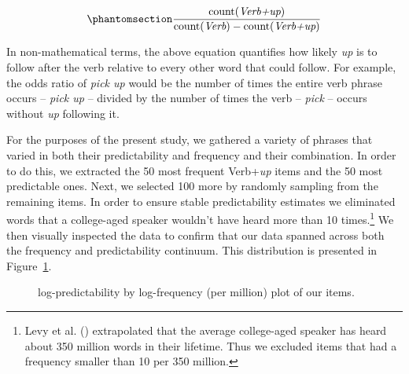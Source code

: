 \documentclass[
  12pt,
  letterpaper,
]{scrreport}
\begin{document}
\begin{equation}\phantomsection\label{eq-logodds}{
\frac{\mathrm{count(\textit{Verb+up})}}{\mathrm{count(\textit{Verb})} - \mathrm{count(\textit{Verb+up})}} 
}\end{equation}

In non-mathematical terms, the above equation quantifies how likely
\emph{up} is to follow after the verb relative to every other word that
could follow. For example, the odds ratio of \emph{pick up} would be the
number of times the entire verb phrase occurs -- \emph{pick up} --
divided by the number of times the verb -- \emph{pick} -- occurs without
\emph{up} following it.

For the purposes of the present study, we gathered a variety of phrases
that varied in both their predictability and frequency and their
combination. In order to do this, we extracted the 50 most frequent
Verb+\emph{up} items and the 50 most predictable ones. Next, we selected
100 more by randomly sampling from the remaining items. In order to
ensure stable predictability estimates we eliminated words that a
college-aged speaker wouldn't have heard more than 10 times.\footnote{Levy
  et al. ()
  extrapolated that the average college-aged speaker has heard about 350
  million words in their lifetime. Thus we excluded items that had a
  frequency smaller than 10 per 350 million.} We then visually inspected
the data to confirm that our data spanned across both the frequency and
predictability continuum. This distribution is presented in
Figure~\ref{fig-stimplot}.

\begin{figure}[htbp]

\caption{\label{fig-stimplot}log-predictability by log-frequency (per
million) plot of our items.}


\end{figure}%
\end{document}
